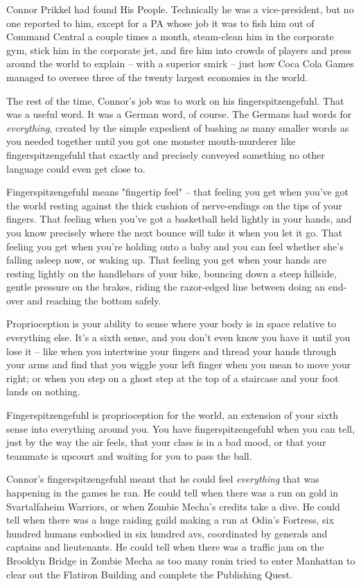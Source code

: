 Connor Prikkel had found His People. Technically he was a
vice-president, but no one reported to him, except for a PA whose
job it was to fish him out of Command Central a couple times a
month, steam-clean him in the corporate gym, stick him in the
corporate jet, and fire him into crowds of players and press around
the world to explain -- with a superior smirk -- just how Coca Cola
Games managed to oversee three of the twenty largest economies in
the world.

The rest of the time, Connor's job was to work on his
fingerspitzengefuhl. That was a useful word. It was a German word,
of course. The Germans had words for \emph{everything}, created by
the simple expedient of bashing as many smaller words as you needed
together until you got one monster mouth-murderer like
fingerspitzengefuhl that exactly and precisely conveyed something
no other language could even get close to.

Fingerspitzengefuhl means "fingertip feel" -- that feeling you get
when you've got the world resting against the thick cushion of
nerve-endings on the tips of your fingers. That feeling when you've
got a basketball held lightly in your hands, and you know precisely
where the next bounce will take it when you let it go. That feeling
you get when you're holding onto a baby and you can feel whether
she's falling asleep now, or waking up. That feeling you get when
your hands are resting lightly on the handlebars of your bike,
bouncing down a steep hillside, gentle pressure on the brakes,
riding the razor-edged line between doing an end-over and reaching
the bottom safely.

Proprioception is your ability to sense where your body is in space
relative to everything else. It's a sixth sense, and you don't even
know you have it until you lose it -- like when you intertwine your
fingers and thread your hands through your arms and find that you
wiggle your left finger when you mean to move your right; or when
you step on a ghost step at the top of a staircase and your foot
lands on nothing.

Fingerspitzengefuhl is proprioception for the world, an extension
of your sixth sense into everything around you. You have
fingerspitzengefuhl when you can tell, just by the way the air
feels, that your class is in a bad mood, or that your teammate is
upcourt and waiting for you to pass the ball.

Connor's fingerspitzengefuhl meant that he could feel
\emph{everything} that was happening in the games he ran. He could
tell when there was a run on gold in Svartalfaheim Warriors, or
when Zombie Mecha's credits take a dive. He could tell when there
was a huge raiding guild making a run at Odin's Fortress, six
hundred humans embodied in six hundred avs, coordinated by generals
and captains and lieutenants. He could tell when there was a
traffic jam on the Brooklyn Bridge in Zombie Mecha as too many
ronin tried to enter Manhattan to clear out the Flatiron Building
and complete the Publishing Quest.

